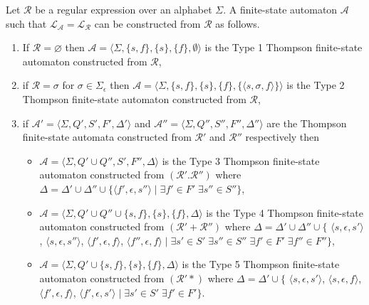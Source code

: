 \begin{theorem}\label{t_thompson}
	Let $\mathcal{R}$ be a regular expression over an alphabet $\Sigma$. A
	finite-state automaton $\mathcal{A}$ such that $\mathcal{L}_\mathcal{A} =
	\mathcal{L}_\mathcal{R}$ can be constructed from $\mathcal{R}$ as follows.
	\begin{enumerate}
		\item If $\mathcal{R} = \varnothing$ then $\mathcal{A} = \langle
			\Sigma, \{ s, f \}, \{ s \}, \{ f \}, \emptyset \rangle$ is
			the Type 1 Thompson finite-state automaton constructed from
			$\mathcal{R}$,
		\item if $\mathcal{R} = \sigma$ for $\sigma \in \Sigma_\epsilon$
			then $\mathcal{A} = \langle \Sigma, \{ s, f \}, \{ s \}, \{
			f \}, \{ \langle s, \sigma, f \rangle \} \rangle$ is the Type
			2 Thompson finite-state automaton constructed from
			$\mathcal{R}$,
		\item if $\mathcal{A}' = \langle \Sigma, Q', S', F', \Delta'
			\rangle$ and $\mathcal{A}'' = \langle \Sigma, Q'', S'', F'',
			\Delta'' \rangle$ are the Thompson finite-state automata
			constructed from $\mathcal{R}'$ and $\mathcal{R}''$
			respectively then
			\begin{itemize}
				\item $\mathcal{A} = \langle \Sigma, Q' \cup Q'',
					S', F'', \Delta \rangle$ is the Type 3
					Thompson finite-state automaton constructed
					from $(\mathcal{R}'.\mathcal{R}'')$ where
					$\Delta = \Delta' \cup \Delta'' \cup \{
					\langle f', \epsilon, s'' \rangle \mid
					\exists f' \in F' \; \exists s'' \in S'' \}$,
				\item $\mathcal{A} = \langle \Sigma, Q' \cup Q''
					\cup \{ s, f \}, \{ s \}, \{ f \},
					\Delta \rangle$ is the Type 4 Thompson
					finite-state automaton constructed from
					$(\mathcal{R}'+\mathcal{R}'')$ where 
					$\Delta = \Delta' \cup \Delta'' \cup \{$
					$\langle s, \epsilon, s' \rangle$,
					$\langle s, \epsilon, s'' \rangle$,
					$\langle f', \epsilon, f \rangle$,
					$\langle f'', \epsilon, f \rangle \mid
					\exists s' \in S' \; \exists s'' \in S'' \;
					\exists f' \in F' \; \exists f'' \in F'' \}$,
				\item $\mathcal{A} = \langle \Sigma, Q' \cup \{ s,
					f \}, \{ s \}, \{ f \}, \Delta \rangle$
					is the Type 5 Thompson finite-state automaton
					constructed from $(\mathcal{R}'*)$ where 
					$\Delta = \Delta' \cup \{$
					$\langle s, \epsilon, s' \rangle$,
					$\langle s, \epsilon, f \rangle$,
					$\langle f', \epsilon, f \rangle$,
					$\langle f', \epsilon, s' \rangle \mid
					\exists s' \in S' \; \exists f' \in F' \}$.
			\end{itemize}
	\end{enumerate}
\end{theorem}

